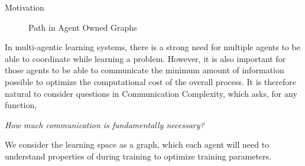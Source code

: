 \begin{block}{Motivation}
\begin{figure}[H]
\caption{Path in Agent Owned Graphs}
\end{figure}

In multi-agentic learning systems, there is a strong need for multiple agents
to be able to coordinate while learning a problem. However, it is also
\mbox{important} for those agents to be able to communicate the minimum amount of
information possible to optimize the computational cost of the overall process.
It is therefore natural to consider questions in Communication Complexity,
which asks, for any function,

\begin{center}
\textit{How much communication is fundamentally necessary?}
\end{center}

We consider the learning space as a graph, which each agent will
need to understand properties of during training to optimize training parameters.

\end{block}

